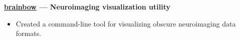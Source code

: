 \documentclass[11pt,a4paper]{article}
\begin{document}
\textbf{\href{https://pypi.org/project/brainbow/}{brainbow} — Neuroimaging visualization utility}
\begin{itemize}[leftmargin=*,noitemsep]
    \item Created a command-line tool for visualizing obscure neuroimaging data formats.
\end{itemize}









\end{document}
